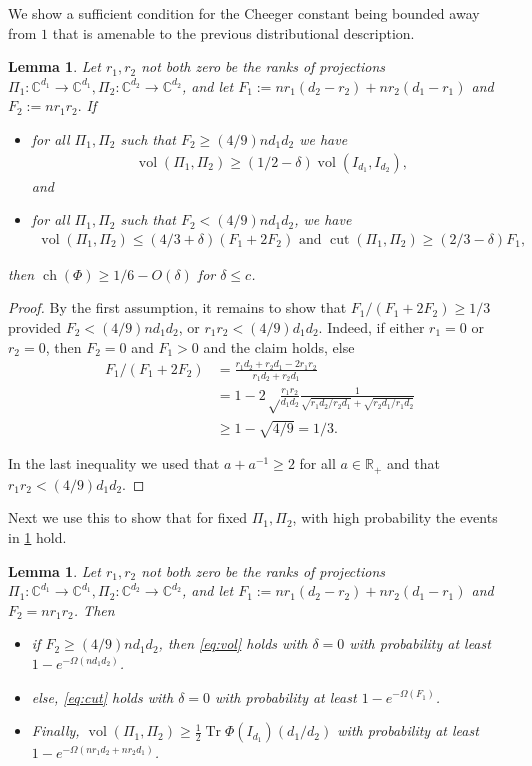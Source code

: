 \documentclass{article}
\newtheorem{lemma}[theorem]{Lemma}
\newcommand{\R}{{\mathbb{R}}}
\newcommand{\C}{{\mathbb{C}}}
\newcommand{\ch}{\operatorname{ch}}
\newcommand{\cut}{\operatorname{cut}}
\newcommand{\vol}{\operatorname{vol}}
\newcommand\tr{\operatorname{Tr}}
\begin{document}
 We show a sufficient condition for the Cheeger constant being bounded away from $1$ that is amenable to the previous distributional description.
\begin{lemma}\label{lem:suff}
Let $r_1, r_2$ not both zero be the ranks of projections $\Pi_1: \C^{d_1} \to \C^{d_1}, \Pi_2: \C^{d_2} \to \C^{d_2}$, and let $F_1:= n r_1(d_2 - r_2) + n r_2(d_1-r_1)$ and $F_2:=n r_1r_2.$ If
\begin{itemize}
\item for all $\Pi_1, \Pi_2$ such that $F_2 \geq (4/9) n d_1 d_2$ we have
\begin{gather}\vol(\Pi_1, \Pi_2) \geq (1/2 - \delta) \vol(I_{d_1}, I_{d_2}),\label{eq:vol}\end{gather} and
\item for all $\Pi_1, \Pi_2$ such that $F_2 < (4/9) n d_1 d_2$, we have
\begin{gather} \vol(\Pi_1, \Pi_2) \leq (4/3 + \delta)(F_1 + 2 F_2) \textrm{ and } \cut(\Pi_1, \Pi_2) \geq (2/3 - \delta) F_1,\label{eq:cut} \end{gather}
\end{itemize}
then $\ch(\Phi) \geq 1/6 - O(\delta)$ for $\delta \leq c$.
\end{lemma}
\begin{proof} By the first assumption, it remains to show that $F_1/(F_1 + 2 F_2) \geq 1/3$ provided $F_2 < (4/9) n d_1 d_2$, or $r_1 r_2 < (4/9) d_1 d_2$. Indeed, if either $r_1 = 0$ or $r_2 = 0$, then $F_2 = 0$ and $F_1>0$ and the claim holds, else
\begin{align*}F_1/(F_1 + 2 F_2) &= \frac{r_1 d_2 + r_2 d_1 - 2 r_1 r_2}{r_1 d_2 + r_2 d_1}\\
 &= 1 -2 \sqrt\frac{ r_1 r_2}{d_1 d_2} \frac{1}{ \sqrt{ r_1 d_2/r_2 d_1} + \sqrt{r_2 d_1/ r_1 d_2}} \\
 &\geq 1 - \sqrt{4/9} = 1/3.
\end{align*}

In the last inequality we used that $a + a^{-1} \geq 2$ for all $a \in \R_+$ and that $r_1 r_2 < (4/9) d_1 d_2$. \end{proof}


Next we use this to show that for fixed $\Pi_1, \Pi_2$, with high probability the events in \cref{lem:suff} hold.
\begin{lemma}\label{lem:probabilities}
Let $r_1, r_2$ not both zero be the ranks of projections $\Pi_1: \C^{d_1} \to \C^{d_1}, \Pi_2: \C^{d_2} \to \C^{d_2}$, and let $F_1:= n r_1(d_2 - r_2) + n r_2(d_1-r_1)$ and $F_2 = n r_1 r_2$. Then
\begin{itemize}
\item if $F_2 \geq (4/9) n d_1 d_2$, then \cref{eq:vol} holds with $\delta = 0$ with probability at least $1 - e^{-\Omega( n d_1 d_2)}$.
\item else, \cref{eq:cut} holds with $\delta = 0$ with probability at least $1 - e^{-\Omega( F_1)}$.
\item Finally, $\vol(\Pi_1, \Pi_2) \geq \frac{1}{2}\tr \Phi(I_{d_1}) (d_1/d_2)$ with probability at least $1 - e^{- \Omega(n r_1 d_2 + n r_2 d_1)}$.
\end{itemize}
\end{lemma}
\end{document}
